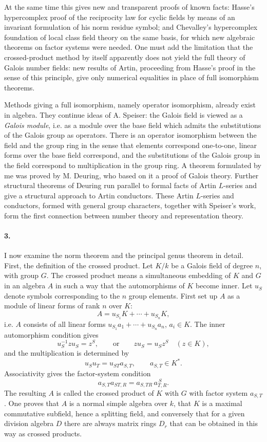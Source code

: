 \documentclass[11pt]{article}
\begin{document}
At the same time this gives new and transparent proofs of known facts: Hasse's hypercomplex proof of the reciprocity law for cyclic fields by means of an invariant formulation of his norm residue symbol; and Chevalley's hypercomplex foundation of local class field theory on the same basis, for which new algebraic theorems on factor systems were needed. One must add the limitation that the crossed-product method by itself apparently does not yield the full theory of Galois number fields: new results of Artin, proceeding from Hasse's proof in the sense of this principle, give only numerical equalities in place of full isomorphism theorems.

Methods giving a full isomorphism, namely operator isomorphism, already exist in algebra. They continue ideas of A. Speiser: the Galois field is viewed as a \emph{Galois module}, i.e. as a module over the base field which admits the substitutions of the Galois group as operators. There is an operator isomorphism between the field and the group ring in the sense that elements correspond one-to-one, linear forms over the base field correspond, and the substitutions of the Galois group in the field correspond to multiplication in the group ring. A theorem formulated by me was proved by M. Deuring, who based on it a proof of Galois theory. Further structural theorems of Deuring run parallel to formal facts of Artin \(L\)-series and give a structural approach to Artin conductors. These Artin \(L\)-series and conductors, formed with general group characters, together with Speiser's work, form the first connection between number theory and representation theory.

\paragraph{3.}
I now examine the norm theorem and the principal genus theorem in detail. First, the definition of the crossed product. Let \(K/k\) be a Galois field of degree \(n\), with group \(G\). The crossed product means a simultaneous embedding of \(K\) and \(G\) in an algebra \(A\) in such a way that the automorphisms of \(K\) become inner. Let \(u_S\) denote symbols corresponding to the \(n\) group elements. First set up \(A\) as a module of linear forms of rank \(n\) over \(K\):
\[
        A=u_{S_1}K+\cdots+u_{S_n}K ,
\]
i.e. \(A\) consists of all linear forms \(u_{S_1}a_1+\cdots+u_{S_n}a_n\), \(a_i\in K\). The inner automorphism condition gives
\[
        u_S^{-1}zu_S=z^S,\qquad\text{or}\qquad
        zu_S=u_Sz^S\quad (z\in K),
\]
and the multiplication is determined by
\[
        u_Su_T=u_{ST}a_{S,T},\qquad a_{S,T}\in K^* .
\]
Associativity gives the factor-system condition
\[
        a_{S,T}a_{ST,R}=a_{S,TR}\,a_{T,R}^{\,S}.
\]
The resulting \(A\) is called the crossed product of \(K\) with \(G\) with factor system \(a_{S,T}\). One proves that \(A\) is a normal simple algebra over \(k\), that \(K\) is a maximal commutative subfield, hence a splitting field, and conversely that for a given division algebra \(D\) there are always matrix rings \(D_r\) that can be obtained in this way as crossed products.
\end{document}
